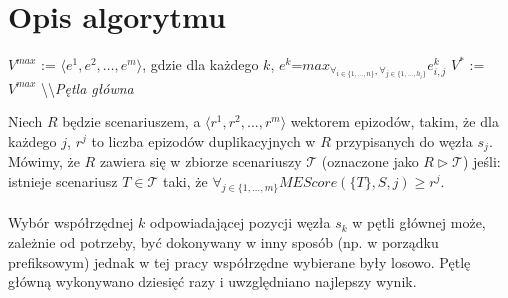 \documentclass[licencjacka]{pracamgr}
\begin{document}
\section{Opis algorytmu}
\begin{algorithm}[H]
 $V^{max}$ := $\langle {e}^1,{e}^2, \dots , {e}^m \rangle$, gdzie dla każdego $k$, ${e}^k$=$max_{\forall_{i \in \{1,\dots,n\}},\forall_{j \in \{1,\dots,h_i\}}}e^k_{i,j}$\;
 $V^*$ := $V^{max}$\;
 \textbackslash\textbackslash \textit{Pętla główna}\;
\end{algorithm}


Niech $R$ będzie scenariuszem, a $\langle r^1,r^2, \dots , r^m \rangle$ wektorem epizodów, takim, że dla każdego $j$, $r^j$ to liczba epizodów duplikacyjnych w $R$ przypisanych do węzła $s_j$. Mówimy, że $R$ zawiera się w zbiorze scenariuszy $\mathcal{T}$ (oznaczone jako $R \triangleright \mathcal{T}$) jeśli: istnieje scenariusz ${T \in \mathcal{T}}$ taki, że $\forall_{j \in \{1,\dots,m\}}MEScore(\{T\},S,j) \geq r^j$.
\\
~\\
Wybór współrzędnej $k$ odpowiadającej pozycji węzła $s_k$ w pętli głównej może, zależnie od potrzeby, być dokonywany w inny sposób (np. w porządku prefiksowym) jednak w tej pracy współrzędne wybierane były losowo. Pętlę główną wykonywano dziesięć razy i uwzględniano najlepszy wynik. 
\end{document}
